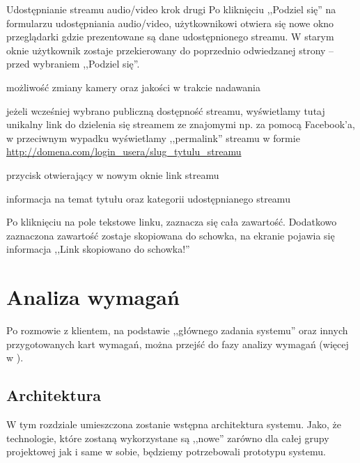 \begin{userstory}{Udostępnianie streamu audio/video krok drugi}
    Po kliknięciu ,,Podziel się'' na formularzu udostępniania audio/video, użytkownikowi otwiera się nowe okno przeglądarki gdzie prezentowane są dane udostępnionego streamu. W starym oknie użytkownik zostaje przekierowany do poprzednio odwiedzanej strony -- przed wybraniem ,,Podziel się''.
    \begin{packed_enum}
        \item{możliwość zmiany kamery oraz jakości w trakcie nadawania}
        \item{jeżeli wcześniej wybrano publiczną dostępność streamu, wyświetlamy tutaj unikalny link do dzielenia się streamem ze znajomymi np. za pomocą Facebook'a, w przeciwnym wypadku wyświetlamy ,,permalink'' streamu w formie \url{http://domena.com/login_usera/slug_tytulu_streamu}}
        \item{przycisk otwierający w nowym oknie link streamu}
        \item{informacja na temat tytułu oraz kategorii udostępnianego streamu}
    \end{packed_enum}
    \begin{tests}
        \item{Po kliknięciu na pole tekstowe linku, zaznacza się cała zawartość. Dodatkowo zaznaczona zawartość zostaje skopiowana do schowka, na ekranie pojawia się informacja ,,Link skopiowano do schowka!''}
    \end{tests}
\end{userstory}

\section{Analiza wymagań}
\label{sec:EtapIaw}

Po rozmowie z klientem, na podstawie ,,głównego zadania systemu'' oraz innych przygotowanych kart wymagań, można przejść do fazy analizy wymagań (więcej w ). 

\subsection{Architektura}
\label{sec:EtapIawArchitektura}

W tym rozdziale umieszczona zostanie wstępna architektura systemu. Jako, że technologie, które zostaną wykorzystane są ,,nowe'' zarówno dla całej grupy projektowej jak i same w sobie, będziemy potrzebowali prototypu systemu.

